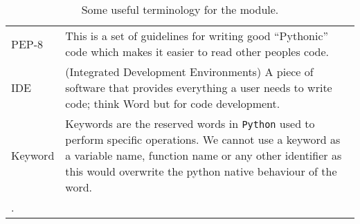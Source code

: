 \begin{longtable}{l p{12cm}}
PEP-8 & This is a set of guidelines for writing good ``Pythonic'' code which makes it easier to read other peoples code. \\
IDE & (Integrated Development Environments) A piece of software that provides everything a user needs to write code; think Word but for code development. \\
Keyword & Keywords are the reserved words in \texttt{Python} used to perform specific operations. We cannot use a keyword as a variable name, function name or any other identifier as this would overwrite the python native behaviour of the word. \\
\caption {Some useful terminology for the module.} . \\
\end{longtable}
\endgroup
